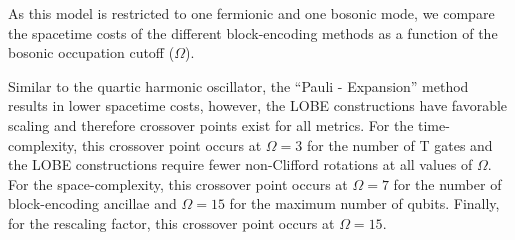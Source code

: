 As this model is restricted to one fermionic and one bosonic mode, we compare the spacetime costs of the different block-encoding methods as a function of the bosonic occupation cutoff ($\Omega$).

Similar to the quartic harmonic oscillator, the ``Pauli - Expansion'' method results in lower spacetime costs, however, the LOBE constructions have favorable scaling and therefore crossover points exist for all metrics.
For the time-complexity, this crossover point occurs at $\Omega = 3$ for the number of T gates and the LOBE constructions require fewer non-Clifford rotations at all values of $\Omega$.
For the space-complexity, this crossover point occurs at $\Omega = 7$ for the number of block-encoding ancillae and $\Omega = 15$ for the maximum number of qubits.
Finally, for the rescaling factor, this crossover point occurs at $\Omega = 15$.